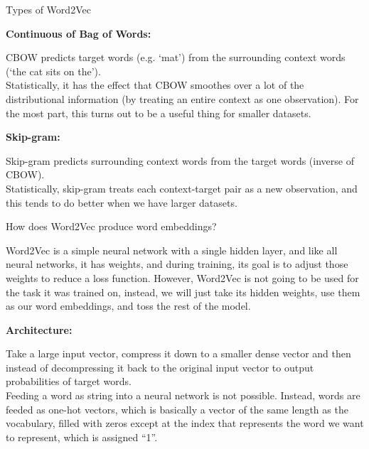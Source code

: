 \documentclass{beamer}
\newcommand\myheading[1]{%
  \par\bigskip
  {\Large\bfseries#1}\par\smallskip}
\begin{document}
\begin{frame}{Types of Word2Vec}
\begin{flushleft}
\myheading{Continuous of Bag of Words:}
CBOW predicts target words (e.g. ‘mat’) from the surrounding context words (‘the cat sits on the’).\\
\vspace{10pt}
Statistically, it has the effect that CBOW smoothes over a lot of the distributional information (by treating an entire context as one observation). For the most part, this turns out to be a useful thing for smaller datasets.\\

\myheading{Skip-gram:}
Skip-gram predicts surrounding context words from the target words (inverse of CBOW).\\
\vspace{10pt}
Statistically, skip-gram treats each context-target pair as a new observation, and this tends to do better when we have larger datasets.
\end{flushleft}
\end{frame}

\begin{frame}{How does Word2Vec produce word embeddings?}
\begin{flushleft}
		Word2Vec is a simple neural network with a single hidden layer, and like all neural networks, it has weights, and during training, its goal is to adjust those weights to reduce a loss function. However, Word2Vec is not going to be used for the task it was trained on, instead, we will just take its hidden weights, use them as our word embeddings, and toss the rest of the model.
\myheading{Architecture:}
Take a large input vector, compress it down to a smaller dense vector and then instead of decompressing it back to the original input vector to output probabilities of target words.\\
\vspace{10pt}
Feeding a word as string into a neural network is not possible.
Instead, words are feeded as one-hot vectors, which is basically a vector of the same length as the vocabulary, filled with zeros except at the index that represents the word we want to represent, which is assigned “1”.\\

\end{flushleft}
\end{frame}
\end{document}

